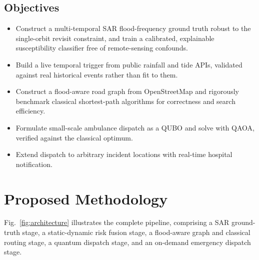 \documentclass[conference]{IEEEtran}
\begin{document}
\subsection{Objectives}
\begin{itemize}
\item Construct a multi-temporal SAR flood-frequency ground truth robust to the single-orbit revisit constraint, and train a calibrated, explainable susceptibility classifier free of remote-sensing confounds.
\item Build a live temporal trigger from public rainfall and tide APIs, validated against real historical events rather than fit to them.
\item Construct a flood-aware road graph from OpenStreetMap and rigorously benchmark classical shortest-path algorithms for correctness and search efficiency.
\item Formulate small-scale ambulance dispatch as a QUBO and solve with QAOA, verified against the classical optimum.
\item Extend dispatch to arbitrary incident locations with real-time hospital notification.
\end{itemize}

\section{Proposed Methodology}
\label{sec:methodology}

Fig.~\ref{fig:architecture} illustrates the complete pipeline, comprising a SAR ground-truth stage, a static-dynamic risk fusion stage, a flood-aware graph and classical routing stage, a quantum dispatch stage, and an on-demand emergency dispatch stage.
\end{document}
